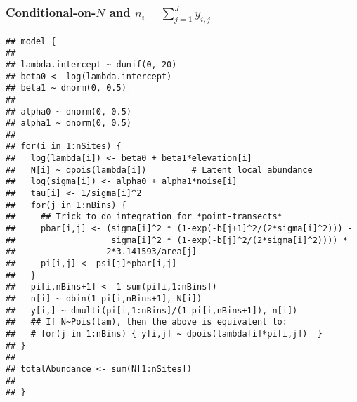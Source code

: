 \documentclass[color=usenames,dvipsnames]{beamer}\usepackage[]{graphicx}\usepackage[]{color}
\makeatletter
\newenvironment{kframe}{%
 \def\at@end@of@kframe{}%
 \ifinner\ifhmode%
  \def\at@end@of@kframe{\end{minipage}}%
  \begin{minipage}{\columnwidth}%
 \fi\fi%
 \def\FrameCommand##1{\hskip\@totalleftmargin \hskip-\fboxsep
 \colorbox{shadecolor}{##1}\hskip-\fboxsep
     \hskip-\linewidth \hskip-\@totalleftmargin \hskip\columnwidth}%
 \MakeFramed {\advance\hsize-\width
   \@totalleftmargin\z@ \linewidth\hsize
   \@setminipage}}%
 {\par\unskip\endMakeFramed%
 \at@end@of@kframe}
\newenvironment{knitrout}{}{} %
\makeatother
\begin{document}
\begin{frame}[fragile]
  \frametitle{\normalsize Conditional-on-$N$ and $n_i=\sum_{j=1}^{J} y_{i,j}$}
\vspace{-3pt}
\begin{knitrout}\tiny
{}\color{fgcolor}\begin{kframe}
\begin{verbatim}
## model {
## 
## lambda.intercept ~ dunif(0, 20)
## beta0 <- log(lambda.intercept)
## beta1 ~ dnorm(0, 0.5)
## 
## alpha0 ~ dnorm(0, 0.5)
## alpha1 ~ dnorm(0, 0.5)
## 
## for(i in 1:nSites) {
##   log(lambda[i]) <- beta0 + beta1*elevation[i]
##   N[i] ~ dpois(lambda[i])         # Latent local abundance
##   log(sigma[i]) <- alpha0 + alpha1*noise[i]
##   tau[i] <- 1/sigma[i]^2
##   for(j in 1:nBins) {
##     ## Trick to do integration for *point-transects*
##     pbar[i,j] <- (sigma[i]^2 * (1-exp(-b[j+1]^2/(2*sigma[i]^2))) -
##                   sigma[i]^2 * (1-exp(-b[j]^2/(2*sigma[i]^2)))) * 
##                  2*3.141593/area[j]
##     pi[i,j] <- psi[j]*pbar[i,j]
##   }
##   pi[i,nBins+1] <- 1-sum(pi[i,1:nBins])
##   n[i] ~ dbin(1-pi[i,nBins+1], N[i])
##   y[i,] ~ dmulti(pi[i,1:nBins]/(1-pi[i,nBins+1]), n[i])
##   ## If N~Pois(lam), then the above is equivalent to:
##   # for(j in 1:nBins) { y[i,j] ~ dpois(lambda[i]*pi[i,j])  }
## }
## 
## totalAbundance <- sum(N[1:nSites])
## 
## }
\end{verbatim}
\end{kframe}
\end{knitrout}
\end{frame}
\end{document}
